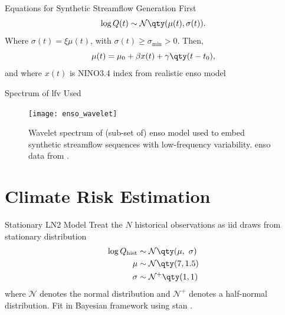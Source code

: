 \documentclass[
  10pt,     %
  handout   %
]{beamer}
\newcommand{\normal}{\mathcal{N}}
\begin{document}
\begin{frame}{Equations for Synthetic Streamflow Generation}
  First
  \begin{equation} \label{eq:lognormal}
    \log Q(t) \sim \normal \qty(\mu(t), \sigma(t)).
  \end{equation}
  Where $\sigma(t) = \xi \mu(t)$, with $\sigma(t) \geq \sigma_\text{min} > 0$.
  Then,
  \begin{equation}\label{eq:nino3}
    \mu(t) = \mu_0 + \beta x(t) + \gamma \qty(t - t_0),
  \end{equation}
  and where $x(t)$ is NINO3.4 index from realistic \gls{enso} model \citep{Zebiak:1987cl,Ramesh:2016hf}
\end{frame}

\begin{frame}{Spectrum of \gls{lfv} Used}
  \begin{figure}
    \texttt{[image: enso\_wavelet]}
    \caption{
      Wavelet spectrum of (sub-set of) \gls{enso} model used to embed synthetic streamflow sequences with low-frequency variability.
      \gls{enso} data from \citet{Ramesh:2016hf}.
    }
  \end{figure}
\end{frame}

\section{Climate Risk Estimation}

\begin{frame}{Stationary LN2 Model}
  Treat the $N$ historical observations as \gls{iid} draws from stationary distribution
  \begin{align}\label{eq:ln2-stationary}
    \begin{split}
      \log Q_\text{hist} & \sim \normal \qty(\mu, \ \sigma) \\
      \mu &\sim \normal \qty(7, 1.5) \\
      \sigma &\sim \normal^+ \qty(1, 1)
    \end{split}
  \end{align}
  where $\normal$ denotes the normal distribution and $\normal^+$ denotes a half-normal distribution.
  Fit in Bayesian framework using stan \citep{Carpenter:2017ke}.
\end{frame}
\end{document}
